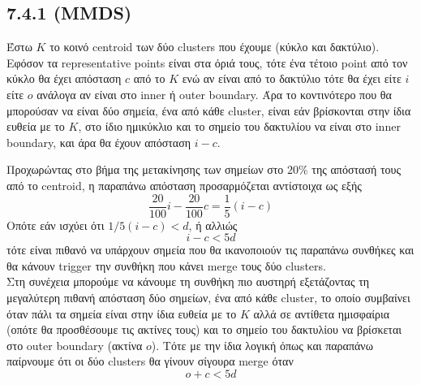 \documentclass[a4paper,11pt]{article}
\begin{document}
\subsection*{7.4.1 (MMDS)}

Έστω $K$ το κοινό centroid των δύο clusters που έχουμε (κύκλο και δακτύλιο).
Εφόσον τα representative points είναι στα όριά τους, τότε ένα τέτοιο point από τον κύκλο θα έχει απόσταση $c$ από το $K$ ενώ αν είναι από το δακτύλιο τότε θα έχει είτε $i$ είτε $o$ ανάλογα αν είναι στο inner ή outer boundary.
Άρα το κοντινότερο που θα μπορούσαν να είναι δύο σημεία, ένα από κάθε cluster, είναι εάν βρίσκονται στην ίδια ευθεία με το $K$, στο ίδιο ημικύκλιο και το σημείο του δακτυλίου να είναι στο inner boundary, και άρα θα έχουν απόσταση $i-c$.

Προχωρώντας στο βήμα της μετακίνησης των σημείων στο $20\%$ της απόστασή τους από το centroid, η παραπάνω απόσταση προσαρμόζεται αντίστοιχα ως εξής
\[ \frac{20}{100}i-\frac{20}{100}c = \frac{1}{5}(i-c) \]
Οπότε εάν ισχύει ότι $1/5(i-c)<d$, ή αλλιώς
\[ i-c < 5d \]
τότε είναι πιθανό να υπάρχουν σημεία που θα ικανοποιούν τις παραπάνω συνθήκες και θα κάνουν trigger την συνθήκη που κάνει merge τους δύο clusters.
\\[8pt]
Στη συνέχεια μπορούμε να κάνουμε τη συνθήκη πιο αυστηρή εξετάζοντας τη μεγαλύτερη πιθανή απόσταση δύο σημείων, ένα από κάθε cluster, το οποίο συμβαίνει όταν πάλι τα σημεία είναι στην ίδια ευθεία με το $K$ αλλά σε αντίθετα ημισφαίρια (οπότε θα προσθέσουμε τις ακτίνες τους) και το σημείο του δακτυλίου να βρίσκεται στο outer boundary (ακτίνα $o$).
Τότε με την ίδια λογική όπως και παραπάνω παίρνουμε ότι οι δύο clusters θα γίνουν σίγουρα merge όταν
\[ o+c < 5d \]
\end{document}
